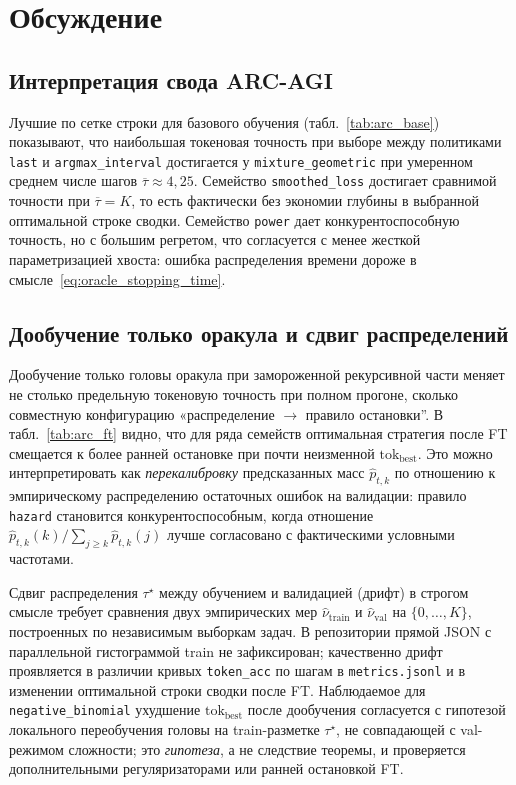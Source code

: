 \section{Обсуждение}\label{sec:discussion}

\subsection{Интерпретация свода ARC-AGI}

Лучшие по сетке строки для базового обучения (табл.~\ref{tab:arc_base}) показывают, что наибольшая токеновая точность при выборе между политиками \texttt{last} и \texttt{argmax\_interval} достигается у \texttt{mixture\_geometric} при умеренном среднем числе шагов \(\overline{\tau}\approx 4{,}25\). Семейство \texttt{smoothed\_loss} достигает сравнимой точности при \(\overline{\tau}=K\), то есть фактически без экономии глубины в выбранной оптимальной строке сводки. Семейство \texttt{power} дает конкурентоспособную точность, но с большим регретом, что согласуется с менее жесткой параметризацией хвоста: ошибка распределения времени дороже в смысле~\eqref{eq:oracle_stopping_time}.

\subsection{Дообучение только оракула и сдвиг распределений}

Дообучение только головы оракула при замороженной рекурсивной части меняет не столько предельную токеновую точность при полном прогоне, сколько совместную конфигурацию «распределение \(\rightarrow\) правило остановки''. В табл.~\ref{tab:arc_ft} видно, что для ряда семейств оптимальная стратегия после FT смещается к более ранней остановке при почти неизменной \(\mathrm{tok}_{\mathrm{best}}\). Это можно интерпретировать как \emph{перекалибровку} предсказанных масс \(\widehat p_{t,k}\) по отношению к эмпирическому распределению остаточных ошибок на валидации: правило \texttt{hazard} становится конкурентоспособным, когда отношение \(\widehat p_{t,k}(k)/\sum_{j\ge k}\widehat p_{t,k}(j)\) лучше согласовано с фактическими условными частотами.

Сдвиг распределения \(\tau^\star\) между обучением и валидацией (дрифт) в строгом смысле требует сравнения двух эмпирических мер \(\widehat\nu_{\mathrm{train}}\) и \(\widehat\nu_{\mathrm{val}}\) на \(\{0,\ldots,K\}\), построенных по независимым выборкам задач. В репозитории прямой JSON с параллельной гистограммой train не зафиксирован; качественно дрифт проявляется в различии кривых \texttt{token\_acc} по шагам в \texttt{metrics.jsonl} и в изменении оптимальной строки сводки после FT. Наблюдаемое для \texttt{negative\_binomial} ухудшение \(\mathrm{tok}_{\mathrm{best}}\) после дообучения согласуется с гипотезой локального переобучения головы на train-разметке \(\tau^\star\), не совпадающей с val-режимом сложности; это \emph{гипотеза}, а не следствие теоремы, и проверяется дополнительными регуляризаторами или ранней остановкой FT.

